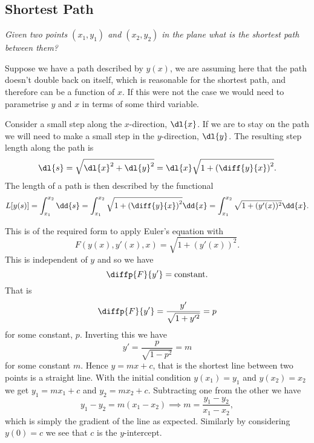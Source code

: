 \documentclass[fleqn]{NotesClass}
\begin{document}
    \subsection{Shortest Path}
    \textit{Given two points \((x_1, y_1)\) and \((x_2, y_2)\) in the plane what is the shortest path between them?}
    
    Suppose we have a path described by \(y(x)\), we are assuming here that the path doesn't double back on itself, which is reasonable for the shortest path, and therefore can be a function of \(x\).
    If this were not the case we would need to parametrise \(y\) and \(x\) in terms of some third variable.
    
    Consider a small step along the \(x\)-direction, \(\dl{x}\).
    If we are to stay on the path we will need to make a small step in the \(y\)-direction, \(\dl{y}\).
    The resulting step length along the path is
    \begin{equation}
        \dl{s} = \sqrt{\dl{x}^2 + \dl{y}^2} = \dl{x}\sqrt{1 + \left( \diff{y}{x} \right)^2}.
    \end{equation}
    The length of a path is then described by the functional
    \begin{equation}
        L[y(s)] = \int_{x_1}^{x_2} \dd{s} = \int_{x_1}^{x_2} \sqrt{1 + \left( \diff{y}{x} \right)^2}\dd{x} = \int_{x_1}^{x_2} \sqrt{1 + (y'(x))^2} \dd{x}.
    \end{equation}

    This is of the required form to apply Euler's equation with
    \begin{equation}
        F(y(x), y'(x), x) = \sqrt{1 + (y'(x))^2}.
    \end{equation}
    This is independent of \(y\) and so we have
    \begin{equation}
        \diffp{F}{y'} = \text{constant.}
    \end{equation}
    That is
    \begin{equation}
        \diffp{F}{y'} = \frac{y'}{\sqrt{1 + y'^2}} = p
    \end{equation}
    for some constant, \(p\).
    Inverting this we have
    \begin{equation}
        y' = \frac{p}{\sqrt{1 - p^2}} = m
    \end{equation}
    for some constant \(m\).
    Hence \(y = mx + c\), that is the shortest line between two points is a straight line.
    With the initial condition \(y(x_1) = y_1\) and \(y(x_2) = x_2\) we get \(y_1 = mx_1 + c\) and \(y_2 = mx_2 + c\).
    Subtracting one from the other we have
    \begin{equation}
        y_1 - y_2 = m(x_1 - x_2) \implies m = \frac{y_1 - y_2}{x_1 - x_2},
    \end{equation}
    which is simply the gradient of the line as expected.
    Similarly by considering \(y(0) = c\) we see that \(c\) is the \(y\)-intercept.
    
\end{document}
